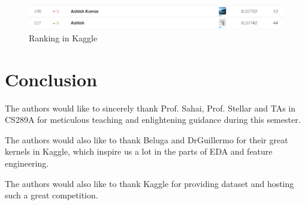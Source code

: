 \begin{figure}[!htbp]
	\centering
	\includegraphics[width=\linewidth]{rank.png}
	\caption{Ranking in Kaggle}
\end{figure}

\section{Conclusion}


\begin{acks}
  The authors would like to sincerely thank Prof. Sahai, Prof. Stellar and TAs in CS289A for meticulous teaching
  and enlightening guidance during this semester.
  
  The authors would also like to thank Beluga and DrGuillermo for their great kernels in Kaggle, which inspire us a lot in the parts of EDA and feature engineering.
  
  The authors would also like to thank Kaggle for providing dataset and hosting such a great competition.

\end{acks}
